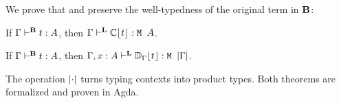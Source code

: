We prove that \transCname{} and \transDname{} preserve the well-typedness of the
original term in \(\LB\):
\begin{theorem}
  If \( \TB{\Gamma}{t}{A} \), then \( \TL{\Gamma}{\transC{t}}{\TM{A}} \).
\end{theorem}

\begin{theorem}\label{thm:transD-type}
  If \( \TB{\Gamma}{t}{A} \), then \( \TL{\Gamma, x : A}{\transD{t}{\Gamma}}{\TM{\verts{\Gamma}}} \).
\end{theorem}
The operation \( \verts{\cdot} \) turns typing contexts into product types. Both
theorems are formalized and proven in Agda.







